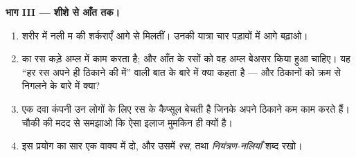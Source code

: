 \begin{problem}[{सप्ताहांत समस्या --- मेज़ पर, नली-दर-नली पाचन
बनाना}]
\medskip\noindent\textbf{भाग III --- शीशे से आँत तक।}
\begin{enumerate}[resume]
  \item शरीर में नली म की शर्कराएँ आगे  से मिलतीं। उनकी
        यात्रा चार पड़ावों में आगे बढ़ाओ।
  \item {} का रस कड़े अम्ल में काम करता है; और आँत के रसों को वह
        अम्ल बेअसर किया हुआ चाहिए। यह ``हर रस अपने ही ठिकाने की
         में'' वाली बात के बारे में क्या कहता है --- और
        ठिकानों को क्रम से निगलने के बारे में क्या?
  \item एक दवा कंपनी उन लोगों के लिए रस के कैप्सूल बेचती है जिनके
        अपने ठिकाने कम काम करते हैं। चौकी की मदद से समझाओ कि ऐसा
        इलाज मुमकिन ही क्यों है।
  \item इस प्रयोग का सार एक वाक्य में दो, और उसमें \emph{रस},
        \emph{} तथा \emph{नियंत्रण-नलियाँ} शब्द रखो।
\end{enumerate}
\end{problem}
